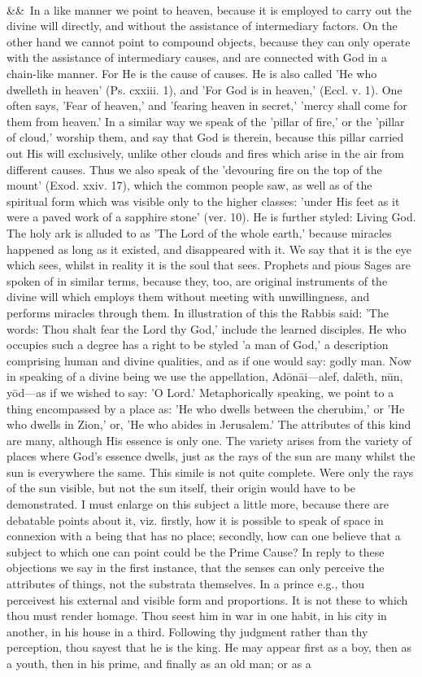 \documentclass[12pt]{article}
\newcommand{\para}[1][]{\par\noindent\ifx&#1&\else\textsuperscript{\footnotesize #1}~\fi}
\begin{document}
\para In a like manner we point to heaven, because it is employed to carry out the divine will directly, and without the assistance of intermediary factors. On the other hand we cannot point to compound objects, because they can only operate with the assistance of intermediary causes, and are connected with God in a chain-like manner. For He is the cause of causes. He is also called 'He who dwelleth in heaven' (Ps. cxxiii. 1), and 'For God is in heaven,' (Eccl. v. 1). One often says, 'Fear of heaven,' and 'fearing heaven in secret,' 'mercy shall come for them from heaven.' In a similar way we speak of the 'pillar of fire,' or the 'pillar of cloud,' worship them, and say that God is therein, because this pillar carried out His will exclusively, unlike other clouds and fires which arise in the air from different causes. Thus we also speak of the 'devouring fire on the top of the mount' (Exod. xxiv. 17), which the common people saw, as well as of the spiritual form which was visible only to the higher classes: 'under His feet as it were a paved work of a sapphire stone' (ver. 10). He is further styled: Living God. The holy ark is alluded to as 'The Lord of the whole earth,' because miracles happened as long as it existed, and disappeared with it. We say that it is the eye which sees, whilst in reality it is the soul that sees. Prophets and pious Sages are spoken of in similar terms, because they, too, are original instruments of the divine will which employs them without meeting with unwillingness, and performs miracles through them. In illustration of this the Rabbis said: 'The words: Thou shalt fear the Lord thy God,' include the learned disciples. He who occupies such a degree has a right to be styled 'a man of God,' a description comprising human and divine qualities, and as if one would say: godly man. Now in speaking of a divine being we use the appellation, Adōnāi---alef, dalēth, nūn, yōd---as if we wished to say: 'O Lord.' Metaphorically speaking, we point to a thing encompassed by a place as: 'He who dwells between the cherubim,' or 'He who dwells in Zion,' or, 'He who abides in Jerusalem.' The attributes of this kind are many, although His essence is only one. The variety arises from the variety of places where God's essence dwells, just as the rays of the sun are many whilst the sun is everywhere the same. This simile is not quite complete. Were only the rays of the sun visible, but not the sun itself, their origin would have to be demonstrated. I must enlarge on this subject a little more, because there are debatable points about it, viz. firstly, how it is possible to speak of space in connexion with a being that has no place; secondly, how can one believe that a subject to which one can point could be the Prime Cause? In reply to these objections we say in the first instance, that the senses can only perceive the attributes of things, not the substrata themselves. In a prince e.g., thou perceivest his external and visible form and proportions. It is not these to which thou must render homage. Thou seest him in war in one habit, in his city in another, in his house in a third. Following thy judgment rather than thy perception, thou sayest that he is the king. He may appear first as a boy, then as a youth, then in his prime, and finally as an old man; or as a 
\end{document}
